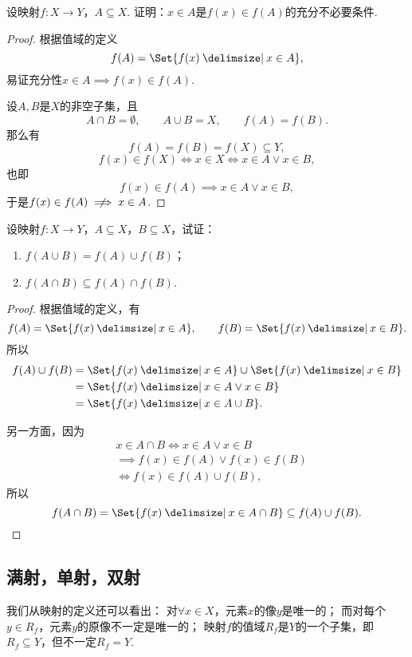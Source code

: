 \begin{example}
设映射\(f\colon X \to Y\)，\(A \subseteq X\).
证明：\(x \in A\)是\(f(x) \in f(A)\)的充分不必要条件.
\begin{proof}
根据值域的定义\[
	f(A) = \Set{ f(x) \given x \in A },
\]
易证充分性\(x \in A \implies f(x) \in f(A)\).

设\(A,B\)是\(X\)的非空子集，且\[
	A \cap B = \emptyset,
	\qquad
	A \cup B = X,
	\qquad
	f(A) = f(B).
\]那么有\[
	f(A) = f(B) = f(X) \subseteq Y,
\]\[
	f(x) \in f(X) \iff x \in X \iff x \in A \lor x \in B,
\]也即\[
	f(x) \in f(A) \implies x \in A \lor x \in B,
\]
于是\(f(x) \in f(A) \notimplies x \in A\).
\end{proof}
\end{example}

\begin{example}
设映射\(f\colon X \to Y\)，\(A \subseteq X\)，\(B \subseteq X\)，试证：\begin{enumerate}
	\item \(f(A \cup B) = f(A) \cup f(B)\)；
	\item \(f(A \cap B) \subseteq f(A) \cap f(B)\).
\end{enumerate}
\begin{proof}
\def\fran#1{ \Set{ f(x) \given #1 } }
根据值域的定义，有\[
	f(A) = \fran{x \in A},
	\qquad
	f(B) = \fran{x \in B}.
\]所以\[
	\begin{split}
		f(A) \cup f(B)
		&= \fran{x \in A} \cup \fran{x \in B} \\
		&= \fran{x \in A \lor x \in B} \\
		&= \fran{x \in A \cup B}.
	\end{split}
\]

另一方面，因为\[
	\begin{split}
		&x \in A \cap B
		\iff
		x \in A \lor x \in B \\
		&\implies
		f(x) \in f(A) \lor f(x) \in f(B) \\
		&\iff
		f(x) \in f(A) \cup f(B),
	\end{split}
\]所以\[
	f(A \cap B) = \fran{x \in A \cap B}
	\subseteq f(A) \cup f(B).
	\qedhere
\]
\end{proof}
\end{example}

\subsection{满射，单射，双射}
我们从映射的定义还可以看出：
对\(\forall x \in X\)，元素\(x\)的像\(y\)是唯一的；
而对每个\(y \in R_f\)，元素\(y\)的原像不一定是唯一的；
映射\(f\)的值域\(R_f\)是\(Y\)的一个子集，即\(R_f \subseteq Y\)，但不一定\(R_f = Y\).

